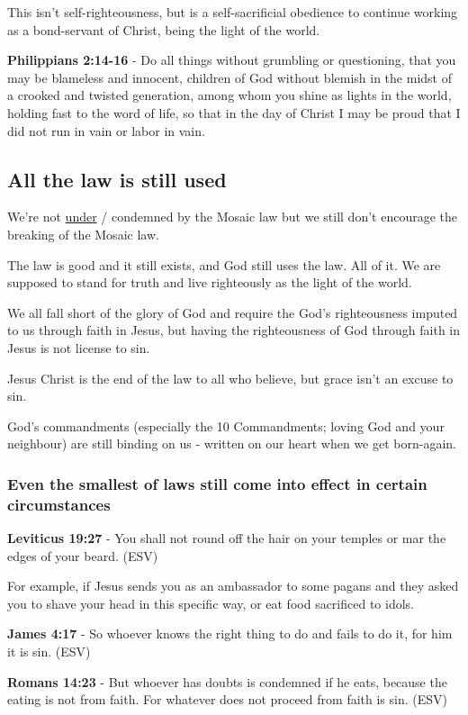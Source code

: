 \documentclass[11pt]{article}
\begin{document}
This isn't self-righteousness, but is a self-sacrificial obedience to continue working as a bond-servant of Christ, being the light of the world.

\textbf{Philippians 2:14-16} - Do all things without grumbling or questioning, that you may be blameless and innocent, children of God without blemish in the midst of a crooked and twisted generation, among whom you shine as lights in the world, holding fast to the word of life, so that in the day of Christ I may be proud that I did not run in vain or labor in vain.

\subsection{All the law is still used}
\label{sec:orgc5a7381}
We're not \uline{under} / condemned by the Mosaic law but we still don't encourage the breaking of the Mosaic law.

The law is good and it still exists, and God still uses the law. All of it. We are supposed to stand for truth and live righteously as the light of the world.

We all fall short of the glory of God and require the God's righteousness imputed to us through faith in Jesus, but having the righteousness of God through faith in Jesus is not license to sin.

Jesus Christ is the end of the law to all who believe, but grace isn't an excuse to sin.

God's commandments (especially the 10 Commandments; loving God and your neighbour) are still binding on us - written on our heart when we get born-again.

\subsubsection{Even the smallest of laws still come into effect in certain circumstances}
\label{sec:orgb9b0711}

\textbf{Leviticus 19:27} - You shall not round off the hair on your temples or mar the edges of your beard. (ESV)

For example, if Jesus sends you as an ambassador to some pagans and they asked you to shave your head in this specific way, or eat food sacrificed to idols.

\textbf{James 4:17} - So whoever knows the right thing to do and fails to do it, for him it is sin. (ESV)

\textbf{Romans 14:23} - But whoever has doubts is condemned if he eats, because the eating is not from faith. For whatever does not proceed from faith is sin. (ESV)
\end{document}

